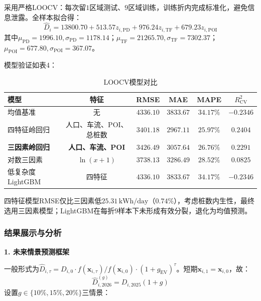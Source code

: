 \documentclass[a4paper,12pt]{ctexart}
\begin{document}
采用严格LOOCV：每次留$1$区域测试、$9$区域训练，训练折内完成标准化，避免信息泄露。全样本拟合得：
\begin{equation}
\boxed{\hat{D}_{i}=13800.70+513.57z_{i,\mathrm{PD}}+976.24z_{i,\mathrm{TF}}+679.23z_{i,\mathrm{POI}}}\tag{1-8}
\end{equation}
其中$\mu_{\mathrm{PD}}=1996.10,\sigma_{\mathrm{PD}}=1178.14$；$\mu_{\mathrm{TF}}=21265.70,\sigma_{\mathrm{TF}}=7302.37$；$\mu_{\mathrm{POI}}=677.80,\sigma_{\mathrm{POI}}=367.07$。

模型验证如表4：

\begin{table}[H]
\centering
\caption{LOOCV模型对比}
\begin{tabular}{lccccc}
\toprule
模型 & 特征 & RMSE & MAE & MAPE & $R^{2}_{\mathrm{CV}}$ \\
\midrule
均值基准 & 无 & $4336.10$ & $3833.67$ & $34.17\%$ & $-0.2346$ \\
四特征岭回归 & 人口、车流、POI、总桩数 & $3401.18$ & $2967.11$ & $25.97\%$ & $0.2404$ \\
\textbf{三因素岭回归} & \textbf{人口、车流、POI} & $\mathbf{3426.49}$ & $3057.64$ & $26.76\%$ & $0.2291$ \\
对数三因素 & $\ln(x+1)$ & $3738.13$ & $3286.49$ & $28.52\%$ & $0.0825$ \\
低复杂度LightGBM & 四特征 & $4336.10$ & $3833.67$ & $34.17\%$ & $-0.2346$ \\
\bottomrule
\end{tabular}
\end{table}

四特征模型RMSE仅比三因素低$25.31\,\mathrm{kWh/day}$（$0.74\%$），考虑桩数内生性，最终选用三因素模型；LightGBM在每折$9$样本下未形成有效分裂，退化为均值预测。

\subsubsection{结果展示与分析}

\textbf{1. 未来情景预测框架}

一般形式为$\widehat{D}_{i,\tau}=D_{i,0}\cdot f(\mathbf{x}_{i,\tau})/f(\mathbf{x}_{i,0})\cdot(1+g_{\mathrm{EV}})^{\tau}$。短期$\mathbf{x}_{i,1}=\mathbf{x}_{i,0}$，故：
\begin{equation}
\boxed{\widehat{D}_{i,2026}^{(g)}=D_{i,2025}(1+g)}\tag{1-9}
\end{equation}
设置$g\in\{10\%,15\%,20\%\}$三情景：
\end{document}
